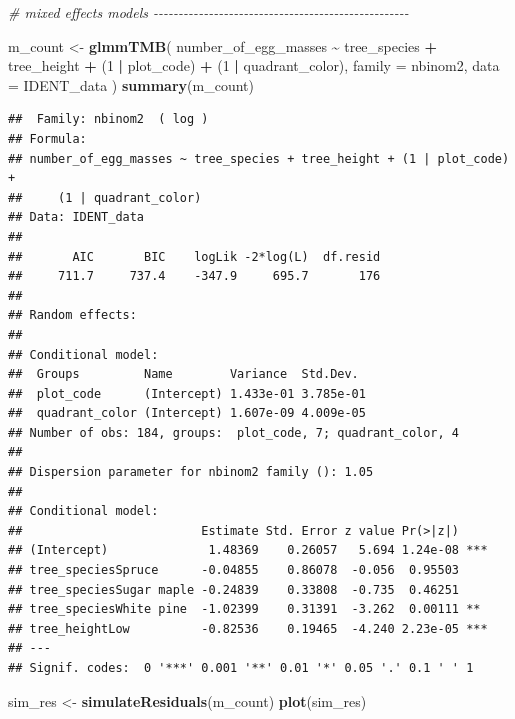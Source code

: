\documentclass[
]{article}
\newenvironment{Shaded}{\begin{snugshade}}{\end{snugshade}}
\newcommand{\AttributeTok}[1]{\textcolor[rgb]{0.13,0.29,0.53}{#1}}
\newcommand{\CommentTok}[1]{\textcolor[rgb]{0.56,0.35,0.01}{\textit{#1}}}
\newcommand{\DecValTok}[1]{\textcolor[rgb]{0.00,0.00,0.81}{#1}}
\newcommand{\FunctionTok}[1]{\textcolor[rgb]{0.13,0.29,0.53}{\textbf{#1}}}
\newcommand{\NormalTok}[1]{#1}
\newcommand{\OtherTok}[1]{\textcolor[rgb]{0.56,0.35,0.01}{#1}}
\newcommand{\SpecialCharTok}[1]{\textcolor[rgb]{0.81,0.36,0.00}{\textbf{#1}}}
\begin{document}
\begin{Shaded}
\begin{Highlighting}[]
\CommentTok{\# mixed effects models {-}{-}{-}{-}{-}{-}{-}{-}{-}{-}{-}{-}{-}{-}{-}{-}{-}{-}{-}{-}{-}{-}{-}{-}{-}{-}{-}{-}{-}{-}{-}{-}{-}{-}{-}{-}{-}{-}{-}{-}{-}{-}{-}{-}{-}{-}{-}{-}{-}{-}{-}}

\NormalTok{m\_count }\OtherTok{\textless{}{-}} \FunctionTok{glmmTMB}\NormalTok{(}
\NormalTok{  number\_of\_egg\_masses }\SpecialCharTok{\textasciitilde{}}\NormalTok{ tree\_species }\SpecialCharTok{+}\NormalTok{ tree\_height }\SpecialCharTok{+}\NormalTok{ (}\DecValTok{1} \SpecialCharTok{|}\NormalTok{ plot\_code) }\SpecialCharTok{+}
\NormalTok{    (}\DecValTok{1} \SpecialCharTok{|}\NormalTok{ quadrant\_color),}
  \AttributeTok{family =}\NormalTok{ nbinom2,}
  \AttributeTok{data =}\NormalTok{ IDENT\_data}
\NormalTok{)}
\FunctionTok{summary}\NormalTok{(m\_count)}
\end{Highlighting}
\end{Shaded}

\begin{verbatim}
##  Family: nbinom2  ( log )
## Formula:          
## number_of_egg_masses ~ tree_species + tree_height + (1 | plot_code) +  
##     (1 | quadrant_color)
## Data: IDENT_data
## 
##       AIC       BIC    logLik -2*log(L)  df.resid 
##     711.7     737.4    -347.9     695.7       176 
## 
## Random effects:
## 
## Conditional model:
##  Groups         Name        Variance  Std.Dev. 
##  plot_code      (Intercept) 1.433e-01 3.785e-01
##  quadrant_color (Intercept) 1.607e-09 4.009e-05
## Number of obs: 184, groups:  plot_code, 7; quadrant_color, 4
## 
## Dispersion parameter for nbinom2 family (): 1.05 
## 
## Conditional model:
##                         Estimate Std. Error z value Pr(>|z|)    
## (Intercept)              1.48369    0.26057   5.694 1.24e-08 ***
## tree_speciesSpruce      -0.04855    0.86078  -0.056  0.95503    
## tree_speciesSugar maple -0.24839    0.33808  -0.735  0.46251    
## tree_speciesWhite pine  -1.02399    0.31391  -3.262  0.00111 ** 
## tree_heightLow          -0.82536    0.19465  -4.240 2.23e-05 ***
## ---
## Signif. codes:  0 '***' 0.001 '**' 0.01 '*' 0.05 '.' 0.1 ' ' 1
\end{verbatim}

\begin{Shaded}
\begin{Highlighting}[]
\NormalTok{sim\_res }\OtherTok{\textless{}{-}} \FunctionTok{simulateResiduals}\NormalTok{(m\_count)}
\FunctionTok{plot}\NormalTok{(sim\_res)}
\end{Highlighting}
\end{Shaded}
\end{document}
